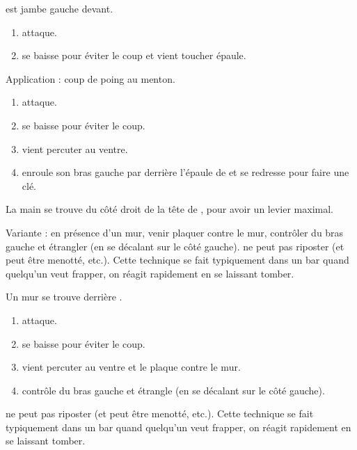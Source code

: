 \begin{exercice}

\D est jambe gauche devant.

\begin{enumerate}
	\item \A attaque.
	
	\item \D se baisse pour éviter le coup et vient toucher épaule.
\end{enumerate}

Application : coup de poing au menton.

\end{exercice}


\begin{technique}

\begin{enumerate}
	\item \A attaque.
	
	\item \D se baisse pour éviter le coup.
	
	\item \D vient percuter \A au ventre.
	
	\item \D enroule son bras gauche par derrière l'épaule de \A et se redresse pour faire une clé.
\end{enumerate}

La main se trouve du côté droit de la tête de \A, pour avoir un levier maximal.

Variante : en présence d'un mur, venir plaquer \A contre le mur, contrôler du bras gauche et étrangler (en se décalant sur le côté gauche).
\A ne peut pas riposter (et peut être menotté, etc.).
Cette technique se fait typiquement dans un bar quand quelqu'un veut frapper, on réagit rapidement en se laissant tomber.

\end{technique}


\begin{technique}

Un mur se trouve derrière \A.

\begin{enumerate}
	\item \A attaque.
	
	\item \D se baisse pour éviter le coup.
	
	\item \D vient percuter \A au ventre et le plaque contre le mur.
	
	\item \D contrôle du bras gauche et étrangle (en se décalant sur le côté gauche).
\end{enumerate}

\A ne peut pas riposter (et peut être menotté, etc.).
Cette technique se fait typiquement dans un bar quand quelqu'un veut frapper, on réagit rapidement en se laissant tomber.

\end{technique}



